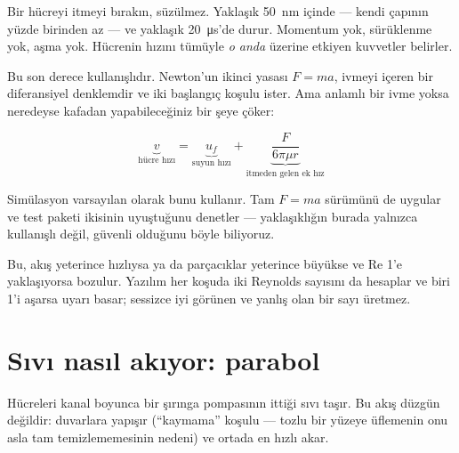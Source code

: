 \documentclass[11pt,a4paper]{article}
\begin{document}
\begin{analogy}
Bir hücreyi itmeyi bırakın, süzülmez. Yaklaşık \SI{50}{\nano\meter} içinde ---
kendi çapının yüzde birinden az --- ve yaklaşık \SI{20}{\micro\second}'de durur.
Momentum yok, sürüklenme yok, aşma yok. Hücrenin hızını tümüyle \emph{o anda}
üzerine etkiyen kuvvetler belirler.
\end{analogy}

Bu son derece kullanışlıdır. Newton'un ikinci yasası $F = ma$, ivmeyi içeren bir
diferansiyel denklemdir ve iki başlangıç koşulu ister. Ama anlamlı bir ivme
yoksa neredeyse kafadan yapabileceğiniz bir şeye çöker:

\begin{equation}
\underbrace{v}_{\text{hücre hızı}}
= \underbrace{u_f}_{\text{suyun hızı}}
+ \underbrace{\frac{F}{6\pi\mu r}}_{\text{itmeden gelen ek hız}}
\label{eq:overdamped}
\end{equation}

Simülasyon varsayılan olarak bunu kullanır. Tam $F=ma$ sürümünü de uygular ve
test paketi ikisinin uyuştuğunu denetler --- yaklaşıklığın burada yalnızca
kullanışlı değil, güvenli olduğunu böyle biliyoruz.

\begin{warnbox}
Bu, akış yeterince hızlıysa ya da parçacıklar yeterince büyükse ve
$\mathrm{Re}$ 1'e yaklaşıyorsa bozulur. Yazılım her koşuda iki Reynolds sayısını
da hesaplar ve biri 1'i aşarsa uyarı basar; sessizce iyi görünen ve yanlış olan
bir sayı üretmez.
\end{warnbox}

\section{Sıvı nasıl akıyor: parabol}

Hücreleri kanal boyunca bir şırınga pompasının ittiği sıvı taşır. Bu akış
düzgün değildir: duvarlara yapışır (``kaymama'' koşulu --- tozlu bir yüzeye
üflemenin onu asla tam temizlememesinin nedeni) ve ortada en hızlı akar.
\end{document}
